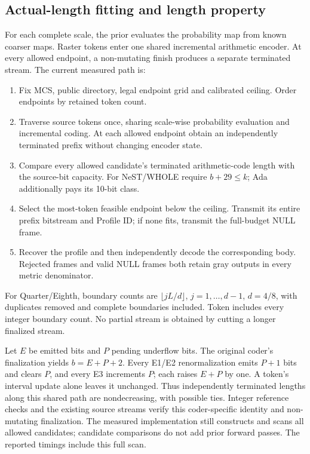 \documentclass[10pt,letterpaper]{article}
\begin{document}
\subsection{Actual-length fitting and length property}
For each complete scale, the prior evaluates the probability map from known coarser maps. Raster tokens enter one shared incremental arithmetic encoder. At every allowed endpoint, a non-mutating finish produces a separate terminated stream. The current measured path is:
\begin{enumerate}
\item Fix MCS, public directory, legal endpoint grid and calibrated ceiling. Order endpoints by retained token count.
\item Traverse source tokens once, sharing scale-wise probability evaluation and incremental coding. At each allowed endpoint obtain an independently terminated prefix without changing encoder state.
\item Compare every allowed candidate's terminated arithmetic-code length with the source-bit capacity. For NeST/WHOLE require $b+29\le k$; Ada additionally pays its 10-bit class.
\item Select the most-token feasible endpoint below the ceiling. Transmit its entire prefix bitstream and Profile ID; if none fits, transmit the full-budget NULL frame.
\item Recover the profile and then independently decode the corresponding body. Rejected frames and valid NULL frames both retain gray outputs in every metric denominator.
\end{enumerate}
For Quarter/Eighth, boundary counts are $\lfloor jL/d\rfloor$, $j=1,\ldots,d-1$, $d=4/8$, with duplicates removed and complete boundaries included. Token includes every integer boundary count. No partial stream is obtained by cutting a longer finalized stream.

Let $E$ be emitted bits and $P$ pending underflow bits. The original coder's finalization yields $b=E+P+2$. Every E1/E2 renormalization emits $P+1$ bits and clears $P$, and every E3 increments $P$; each raises $E+P$ by one. A token's interval update alone leaves it unchanged. Thus independently terminated lengths along this shared path are nondecreasing, with possible ties. Integer reference checks and the existing source streams verify this coder-specific identity and non-mutating finalization. The measured implementation still constructs and scans all allowed candidates; candidate comparisons do not add prior forward passes. The reported timings include this full scan.
\end{document}
